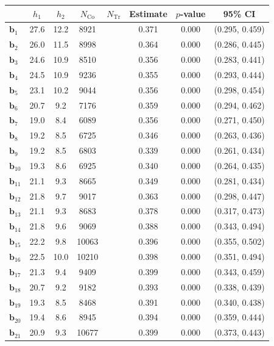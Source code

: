 \documentclass[10pt]{article}
\newcommand{\bb}{\mathbf{b}}
\begin{document}
\begin{table}[p]
    \centering
\begin{tabular}{lccccccc}
  \toprule\toprule
   & $h_1$ & $h_2$ & $N_{\mathrm{Co}}$ & $N_{\mathrm{Tr}}$ & Estimate & $p$-value & 95\% CI \\
  \midrule
   $\bb_{1}$ & 27.6 & 12.2 & 8921 &  & 0.371 & 0.000 & (0.295, 0.459)\\
   $\bb_{2}$ & 26.0 & 11.5 & 8998 &  & 0.364 & 0.000 & (0.286, 0.445)\\
   $\bb_{3}$ & 24.6 & 10.9 & 8510 &  & 0.356 & 0.000 & (0.283, 0.441)\\
   $\bb_{4}$ & 24.5 & 10.9 & 9236 &  & 0.355 & 0.000 & (0.293, 0.444)\\
   $\bb_{5}$ & 23.1 & 10.2 & 9044 &  & 0.356 & 0.000 & (0.298, 0.454)\\
   $\bb_{6}$ & 20.7 & 9.2 & 7176 &  & 0.359 & 0.000 & (0.294, 0.462)\\
   $\bb_{7}$ & 19.0 & 8.4 & 6089 &  & 0.356 & 0.000 & (0.271, 0.450)\\
   $\bb_{8}$ & 19.2 & 8.5 & 6725 &  & 0.346 & 0.000 & (0.263, 0.436)\\
   $\bb_{9}$ & 19.2 & 8.5 & 6803 &  & 0.339 & 0.000 & (0.261, 0.434)\\
   $\bb_{10}$ & 19.3 & 8.6 & 6925 &  & 0.340 & 0.000 & (0.264, 0.435)\\
   $\bb_{11}$ & 21.1 & 9.3 & 8665 &  & 0.349 & 0.000 & (0.281, 0.434)\\
   $\bb_{12}$ & 21.8 & 9.7 & 9017 &  & 0.363 & 0.000 & (0.298, 0.447)\\
   $\bb_{13}$ & 21.1 & 9.3 & 8683 &  & 0.378 & 0.000 & (0.317, 0.473)\\
   $\bb_{14}$ & 21.8 & 9.6 & 9069 &  & 0.388 & 0.000 & (0.343, 0.494)\\
   $\bb_{15}$ & 22.2 & 9.8 & 10063 &  & 0.396 & 0.000 & (0.355, 0.502)\\
   $\bb_{16}$ & 22.5 & 10.0 & 10210 &  & 0.398 & 0.000 & (0.351, 0.494)\\
   $\bb_{17}$ & 21.3 & 9.4 & 9409 &  & 0.399 & 0.000 & (0.343, 0.459)\\
   $\bb_{18}$ & 20.7 & 9.2 & 9182 &  & 0.393 & 0.000 & (0.338, 0.439)\\
   $\bb_{19}$ & 19.3 & 8.5 & 8468 &  & 0.391 & 0.000 & (0.340, 0.438)\\
   $\bb_{20}$ & 19.4 & 8.6 & 8945 &  & 0.394 & 0.000 & (0.359, 0.444)\\
   $\bb_{21}$ & 20.9 & 9.3 & 10677 &  & 0.399 & 0.000 & (0.373, 0.443)\\

\end{tabular}
\end{table}
\end{document}
